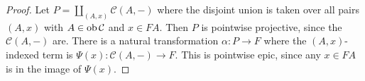 \begin{proof}
    Let \( P = \coprod_{(A, x)} \mathcal C(A, -) \) where the disjoint union is taken over all pairs \( (A, x) \) with \( A \in \operatorname{ob} \mathcal C \) and \( x \in FA \).
    Then \( P \) is pointwise projective, since the \( \mathcal C(A, -) \) are.
    There is a natural transformation \( \alpha : P \to F \) where the \( (A, x) \)-indexed term is \( \Psi(x) : \mathcal C(A, -) \to F \).
    This is pointwise epic, since any \( x \in FA \) is in the image of \( \Psi(x) \). 
\end{proof}
